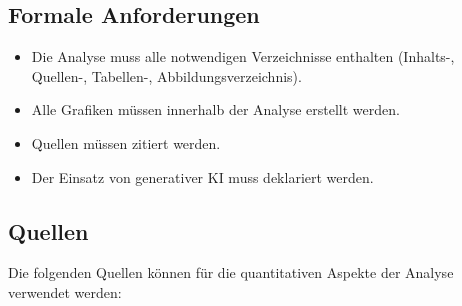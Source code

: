 \documentclass[
  nswissgerman,
  a4paper,
  DIV=11,
  numbers=noendperiod,
  ngerman]{scrreprt}
\providecommand{\tightlist}{%
  \setlength{\itemsep}{0pt}\setlength{\parskip}{0pt}}
\begin{document}
\subsection{Formale Anforderungen}\label{formale-anforderungen}

\begin{itemize}
\tightlist
\item
  Die Analyse muss alle notwendigen Verzeichnisse enthalten (Inhalts-,
  Quellen-, Tabellen-, Abbildungsverzeichnis).
\item
  Alle Grafiken müssen innerhalb der Analyse erstellt werden.
\item
  Quellen müssen zitiert werden.
\item
  Der Einsatz von generativer KI muss deklariert werden.
\end{itemize}

\subsection{Quellen}\label{quellen}

Die folgenden Quellen können für die quantitativen Aspekte der Analyse
verwendet werden:
\end{document}
